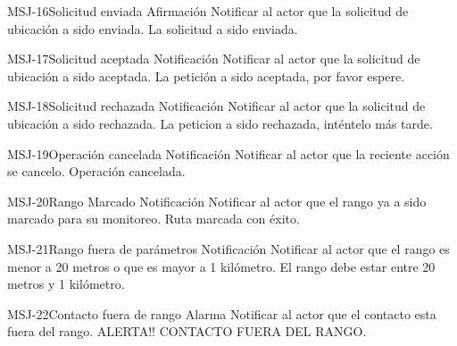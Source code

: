 	\begin{Message}{MSJ-16}{Solicitud enviada}
	\MSGitem[Tipo:] Afirmación
	\MSGitem[Objetivo: ] Notificar al actor que la solicitud de ubicación a sido enviada. 
	\MSGitem[Redacción: ] La solicitud a sido enviada. 
	\end{Message}
	
	\begin{Message}{MSJ-17}{Solicitud aceptada}
	\MSGitem[Tipo:] Notificación
	\MSGitem[Objetivo: ] Notificar al actor que la solicitud de ubicación a sido aceptada. 
	\MSGitem[Redacción: ] La petición a sido aceptada, por favor espere. 
	\end{Message}
	
	\begin{Message}{MSJ-18}{Solicitud rechazada}
	\MSGitem[Tipo:] Notificación
	\MSGitem[Objetivo: ] Notificar al actor que la solicitud de ubicación a sido rechazada. 
	\MSGitem[Redacción: ] La peticion a sido rechazada, inténtelo más tarde. 
	\end{Message}
	
	\begin{Message}{MSJ-19}{Operación cancelada}
	\MSGitem[Tipo:] Notificación
	\MSGitem[Objetivo: ] Notificar al actor que la reciente acción se cancelo. 
	\MSGitem[Redacción: ] Operación cancelada. 
	\end{Message}
	
	\begin{Message}{MSJ-20}{Rango Marcado}
	\MSGitem[Tipo:] Notificación
	\MSGitem[Objetivo: ] Notificar al actor que el rango ya a sido marcado para su monitoreo. 
	\MSGitem[Redacción: ] Ruta marcada con éxito. 
	\end{Message}
	
	\begin{Message}{MSJ-21}{Rango fuera de parámetros}
	\MSGitem[Tipo:] Notificación
	\MSGitem[Objetivo: ] Notificar al actor que el rango es menor a 20 metros o que es mayor a 1 kilómetro. 
	\MSGitem[Redacción: ] El rango debe estar entre 20 metros y 1 kilómetro. 
	\end{Message}
	
	\begin{Message}{MSJ-22}{Contacto fuera de rango}
	\MSGitem[Tipo:] Alarma
	\MSGitem[Objetivo: ] Notificar al actor que el contacto esta fuera del rango. 
	\MSGitem[Redacción: ] ALERTA!! CONTACTO FUERA DEL RANGO. 
	\end{Message}	